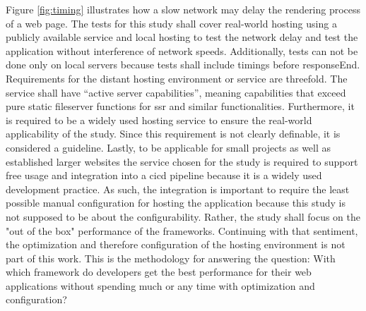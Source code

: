 \documentclass[a4paper, 12pt]{article}
\begin{document}
Figure \ref{fig:timing} illustrates how a slow network may delay the rendering process of a web page.
The tests for this study shall cover real-world hosting using a publicly available service and local hosting to test the network delay and test the application without interference of network speeds.
Additionally, tests can not be done only on local servers because tests shall include timings before responseEnd.
Requirements for the distant hosting environment or service are threefold.
The service shall have \enquote{active server capabilities}, meaning capabilities that exceed pure static fileserver functions for \acrlong{ssr} and similar functionalities.
Furthermore, it is required to be a widely used hosting service to ensure the real-world applicability of the study.
Since this requirement is not clearly definable, it is considered a guideline.
Lastly, to be applicable for small projects as well as established larger websites the service chosen for the study is required to support free usage and integration into a \acrfull{cicd} pipeline because it is a widely used development practice.
As such, the integration is important to require the least possible manual configuration for hosting the application because this study is not supposed to be about the configurability.
Rather, the study shall focus on the "out of the box" performance of the frameworks.
Continuing with that sentiment, the optimization and therefore configuration of the hosting environment is not part of this work.
This is the methodology for answering the question: With which framework do developers get the best performance for their web applications without spending much or any time with optimization and configuration?

\end{document}

